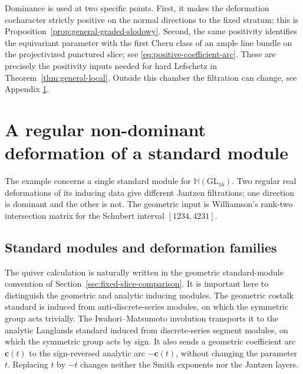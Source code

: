 \documentclass[11pt]{amsart}
\theoremstyle{definition}
\theoremstyle{remark}
\newcommand{\Hh}{\mathbb H}
\begin{document}
Dominance is used at two specific points.  First, it makes the deformation
cocharacter strictly positive on the normal directions to the fixed stratum;
this is Proposition~\ref{prop:general-graded-slodowy}.  Second,
the same positivity identifies the equivariant parameter with the first
Chern class of an ample line bundle on the projectivized punctured
slice; see \eqref{eq:positive-coefficient-arc}.  These are precisely the
positivity inputs needed for hard Lefschetz in
Theorem~\ref{thm:general-local}.  Outside this chamber the
filtration can change, see Appendix \ref{app:counterexample}.  

\appendix
\renewcommand{\theequation}{A.\arabic{equation}}
\setcounter{equation}{0}
\section{A regular non-dominant deformation of a standard module}
\label{app:counterexample}

The example concerns a single standard module for
$\Hh(\mathrm{GL}_{16})$.  Two regular real deformations of its inducing
data give different Jantzen filtrations; one direction is dominant and the
other is not.  The geometric input is Williamson's rank-two intersection
matrix for the Schubert interval $[1234,4231]$.

\subsection{Standard modules and deformation families}

The quiver calculation is naturally written in the geometric
standard-module convention of Section~\ref{sec:fixed-slice-comparison}.  It
is important here to distinguish the geometric and analytic inducing
modules.  The geometric costalk standard is induced from anti-discrete-series
modules, on which the symmetric group acts trivially.  The
Iwahori--Matsumoto involution transports it to the analytic Langlands
standard induced from discrete-series segment modules, on which the
symmetric group acts by sign.  It also sends a geometric coefficient arc
$\mathbf c(t)$ to the sign-reversed analytic arc $-\mathbf c(t)$, without
changing the parameter $t$.  Replacing $t$ by $-t$ changes neither the Smith
exponents nor the Jantzen layers.
\end{document}
